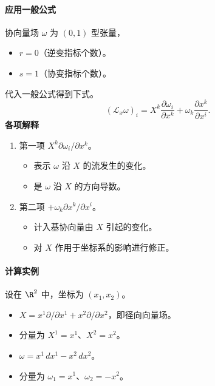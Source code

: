 \paragraph{应用一般公式}
协向量场 $\omega$ 为 $(0,1)$ 型张量，
\begin{itemize}
  \item $r=0$（逆变指标个数）。
  \item $s=1$（协变指标个数）。
\end{itemize}
代入一般公式得到下式。
\[
  (\mathcal L_x\omega)_i=X^k\frac{\partial\omega_i}{\partial x^k}
                        +\omega_k\frac{\partial x^k}{\partial x^i}.
\]
\textbf{各项解释}
\begin{enumerate}
  \item 第一项 $X^k\partial\omega_i/\partial x^k$。
  \begin{itemize}
    \item 表示 $\omega$ 沿 $X$ 的流发生的变化。
    \item 是 $\omega$ 沿 $X$ 的方向导数。
  \end{itemize}
  \item 第二项 $+\omega_k\partial x^k/\partial x^i$。
  \begin{itemize}
    \item 计入基协向量由 $X$ 引起的变化。
    \item 对 $X$ 作用于坐标系的影响进行修正。
  \end{itemize}
\end{enumerate}

\paragraph{计算实例}
设在 $\R^2$ 中，坐标为 $(x_1,x_2)$。
\begin{itemize}
  \item $X=x^1\partial/\partial x^1+x^2\partial/\partial x^2$，即径向向量场。
  \item 分量为 $X^1=x^1$、$X^2=x^2$。
  \item $\omega=x^1\,dx^1-x^2\,dx^2$。
  \item 分量为 $\omega_1=x^1$、$\omega_2=-x^2$。
\end{itemize}

